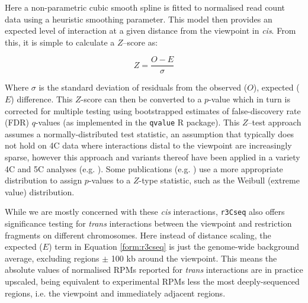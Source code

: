 \documentclass[a4paper,11pt,oneside]{book}
\begin{document}
Here a non-parametric cubic smooth spline is fitted to normalised read count data using a heuristic smoothing parameter. This model then provides an expected level of interaction at a given distance from the viewpoint in \emph{cis}. From this, it is simple to calculate a $Z$--score as:

\begin{equation}\label{form:r3cseq}
Z = \frac{O-E}{\sigma}
\end{equation}

\noindent Where $\sigma$ is the standard deviation of residuals from the observed ($O$), expected ($E$) difference. This $Z$-score can then be converted to a $p$-value which in turn is corrected for multiple testing using bootstrapped estimates of false-discovery rate (FDR) $q$-values\cite{Storey2004} (as implemented in the \texttt{qvalue} R package\cite{qvalue}). This $Z$--test approach assumes a normally-distributed test statistic, an assumption that typically does not hold on 4C data where interactions distal to the viewpoint are increasingly sparse, however this approach and variants thereof have been applied in a variety 4C and 5C analyses (e.g. ). Some publications (e.g. ) use a more appropriate distribution to assign $p$-values to a $Z$-type statistic, such as the Weibull (extreme value) distribution.

While we are mostly concerned with these \emph{cis} interactions, \texttt{r3Cseq} also offers significance testing for \emph{trans} interactions between the viewpoint and restriction fragments on different chromosomes. Here instead of distance scaling, the expected ($E$) term in Equation \ref{form:r3cseq} is just the genome-wide background average, excluding regions $\pm$ 100 kb around the viewpoint.\cite{Thongjuea2013} This means the absolute values of normalised RPMs reported for \emph{trans} interactions are in practice upscaled, being equivalent to experimental RPMs less the most deeply-sequenced regions, i.e. the viewpoint and immediately adjacent regions.


\end{document}
